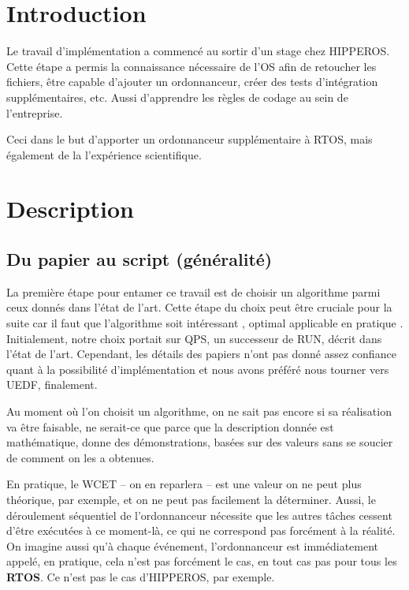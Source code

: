 \section{Introduction}

Le travail d'implémentation a commencé au sortir d'un stage chez HIPPEROS. 
Cette étape a permis la connaissance nécessaire de l'OS afin de retoucher les fichiers, 
être capable d'ajouter un ordonnanceur, créer des tests d'intégration supplémentaires, etc.
Aussi d'apprendre les règles de codage au sein de l'entreprise. 

Ceci dans le but d'apporter un ordonnanceur supplémentaire à RTOS, mais également de la 
l'expérience scientifique.




\section{Description}
	\subsection{Du papier au script (généralité)}
	La première étape pour entamer ce travail est de choisir un algorithme parmi ceux donnés dans l'état de l'art.
	Cette étape du choix peut être cruciale pour la suite car il faut que l'algorithme soit 
	intéressant ,
	optimal 
	applicable en pratique .
	Initialement, notre choix portait sur QPS, un 
	successeur de RUN, décrit dans l'état de l'art. Cependant, les détails des papiers n'ont pas donné 
	assez confiance quant à la possibilité d'implémentation et nous avons préféré nous tourner vers UEDF, finalement.
	
	
	Au moment où l'on choisit un algorithme, on ne sait pas encore si sa réalisation va être faisable, 
	ne serait-ce que parce que la description donnée est mathématique, donne des démonstrations, 
	basées sur des valeurs sans se soucier de comment on les a obtenues.
	
	En pratique, le WCET -- on en reparlera -- est une valeur on ne peut plus théorique, par exemple, 
	et on ne peut pas facilement la déterminer. 
	Aussi, le déroulement séquentiel de l'ordonnanceur nécessite que les autres tâches cessent d'être exécutées 
	à ce moment-là, ce qui ne correspond pas forcément à la réalité.
	On imagine aussi qu'à chaque événement, l'ordonnanceur est immédiatement appelé, 
	en pratique, cela n'est pas forcément le cas, en tout cas pas pour tous les 
	\textbf{RTOS}. Ce n'est pas le cas d'HIPPEROS, par exemple.

